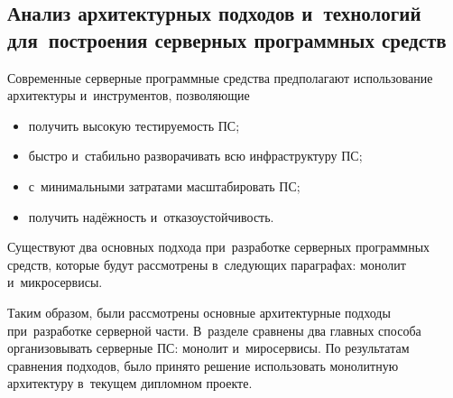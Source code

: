 \subsection{Анализ архитектурных подходов и~технологий для~построения серверных программных средств}
\label{sec:analysis:research:backArch}

Современные серверные программные средства предполагают использование архитектуры и~инструментов, позволяющие

\begin{itemize}
\item получить высокую тестируемость ПС;
\item быстро и~стабильно разворачивать всю инфраструктуру ПС;
\item с~минимальными затратами масштабировать ПС;
\item получить надёжность и~отказоустойчивость.
\end{itemize}

Существуют два основных подхода при~разработке серверных программных средств, которые будут рассмотрены в~следующих параграфах: монолит и~микросервисы.




Таким образом, были рассмотрены основные архитектурные подходы при~разработке серверной части. В~разделе сравнены два главных способа организовывать серверные ПС: монолит и~миросервисы. По результатам сравнения подходов, было принято решение использовать монолитную архитектуру в~текущем дипломном проекте.